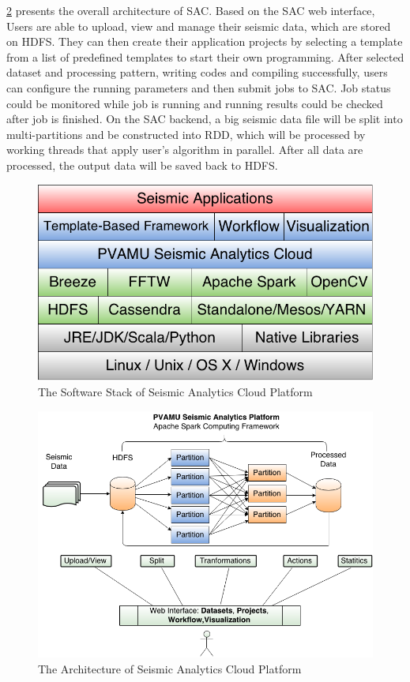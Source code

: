 \ref{SACArch} presents the overall architecture of SAC. Based on the SAC web interface, Users are able to upload, view and manage their seismic data, which are stored on HDFS. They can then create their application projects by selecting a template from a list of predefined templates to start their own programming. After selected dataset and processing pattern, writing codes and compiling successfully, users can configure the running parameters and then submit jobs to SAC. Job status could be monitored while job is running and running results could be checked after job is finished. On the SAC backend, a big seismic data file will be split into multi-partitions and be constructed into RDD, which will be processed by working threads that apply user's algorithm in parallel. After all data are processed, the output data will be saved back to HDFS.

\begin{figure}[H]
\centering
\includegraphics[scale=.50]{figures/SACSWStack.png}
\caption{The Software Stack of Seismic Analytics Cloud Platform}
\label{SACSWStack}
\end{figure}

\begin{figure}[H]
\centering
\includegraphics[scale=.50]{figures/SACArch.png}
\caption{The Architecture of Seismic Analytics Cloud Platform}
\label{SACArch}
\end{figure}

